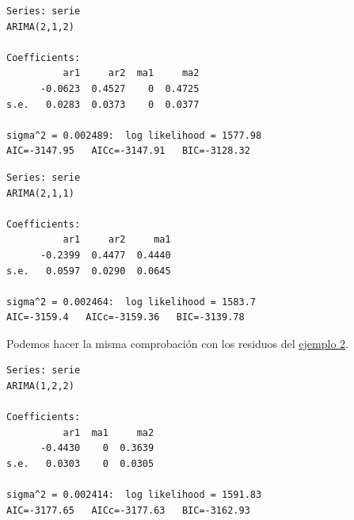 \documentclass[
  12pt,
  a4paper]{article}
\newenvironment{Shaded}{\begin{snugshade}}{\end{snugshade}}
\newcommand{\AttributeTok}[1]{\textcolor[rgb]{0.77,0.63,0.00}{#1}}
\newcommand{\FunctionTok}[1]{\textcolor[rgb]{0.00,0.00,0.00}{#1}}
\newcommand{\NormalTok}[1]{#1}
\newcommand{\SpecialCharTok}[1]{\textcolor[rgb]{0.00,0.00,0.00}{#1}}
\newcommand{\StringTok}[1]{\textcolor[rgb]{0.31,0.60,0.02}{#1}}
\begin{document}
\begin{verbatim}
Series: serie 
ARIMA(2,1,2) 

Coefficients:
          ar1     ar2  ma1     ma2
      -0.0623  0.4527    0  0.4725
s.e.   0.0283  0.0373    0  0.0377

sigma^2 = 0.002489:  log likelihood = 1577.98
AIC=-3147.95   AICc=-3147.91   BIC=-3128.32
\end{verbatim}

\begin{Shaded}
\end{Shaded}

\begin{verbatim}
Series: serie 
ARIMA(2,1,1) 

Coefficients:
          ar1     ar2     ma1
      -0.2399  0.4477  0.4440
s.e.   0.0597  0.0290  0.0645

sigma^2 = 0.002464:  log likelihood = 1583.7
AIC=-3159.4   AICc=-3159.36   BIC=-3139.78
\end{verbatim}

Podemos hacer la misma comprobación con los residuos del
\protect\hyperlink{ejemplo2}{ejemplo 2}.

\begin{Shaded}
\end{Shaded}

\begin{verbatim}
Series: serie 
ARIMA(1,2,2) 

Coefficients:
          ar1  ma1     ma2
      -0.4430    0  0.3639
s.e.   0.0303    0  0.0305

sigma^2 = 0.002414:  log likelihood = 1591.83
AIC=-3177.65   AICc=-3177.63   BIC=-3162.93
\end{verbatim}

\printbibliography
\end{document}

